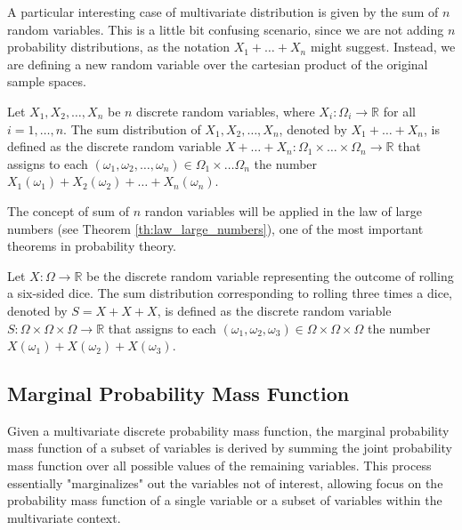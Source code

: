 A particular interesting case of multivariate distribution is given by the sum of $n$ random variables. This is a little bit confusing scenario, since we are not adding $n$ probability distributions, as the notation $X_1 + \ldots + X_n$ might suggest. Instead, we are defining a new random variable over the cartesian product of the original sample spaces.

\begin{definition}
Let $X_1, X_2, \ldots, X_n$ be $n$ discrete random variables, where $X_i : \Omega_i \rightarrow \mathbb{R}$ for all $i=1, \ldots, n$. The sum distribution of $X_1, X_2, \ldots, X_n$, denoted by $X_1 + \ldots + X_n$, is defined as the discrete random variable $X + \ldots + X_n : \Omega_1 \times \ldots \times \Omega_n \rightarrow \mathbb{R}$ that assigns to each $\left( \omega_1, \omega_2, \ldots, \omega_n \right) \in \Omega_1 \times \ldots \Omega_n$ the number $X_1 \left( \omega_1 \right) + X_2 \left( \omega_2 \right) + \ldots + X_n \left( \omega_n \right)$.
\end{definition}

The concept of sum of $n$ randon variables will be applied in the law of large numbers (see Theorem \ref{th:law_large_numbers}), one of the most important theorems in probability theory.

\begin{example}
Let $X: \Omega \rightarrow \mathbb{R}$ be the discrete random variable representing the outcome of rolling a six-sided dice. The sum distribution corresponding to rolling three times a dice, denoted by $S = X + X + X$, is defined as the discrete random variable $S: \Omega \times \Omega \times \Omega \rightarrow \mathbb{R}$ that assigns to each $\left( \omega_1, \omega_2, \omega_3 \right) \in \Omega \times \Omega \times \Omega$ the number $X \left( \omega_1 \right) + X \left( \omega_2 \right) + X \left( \omega_3 \right)$.
\end{example}


\subsection{Marginal Probability Mass Function}


Given a multivariate discrete probability mass function, the marginal probability mass function of a subset of variables is derived by summing the joint probability mass function over all possible values of the remaining variables. This process essentially "marginalizes" out the variables not of interest, allowing focus on the probability mass function of a single variable or a subset of variables within the multivariate context.

